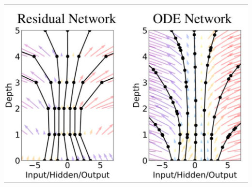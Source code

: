 \documentclass[10pt,a4paper]{article}
\theoremstyle{definition}
\theoremstyle{definition}
\theoremstyle{definition}
\begin{document}
\begin{center}
\includegraphics[scale=0.7]{resnetvsodenet.png}
\end{center}


\end{document}
